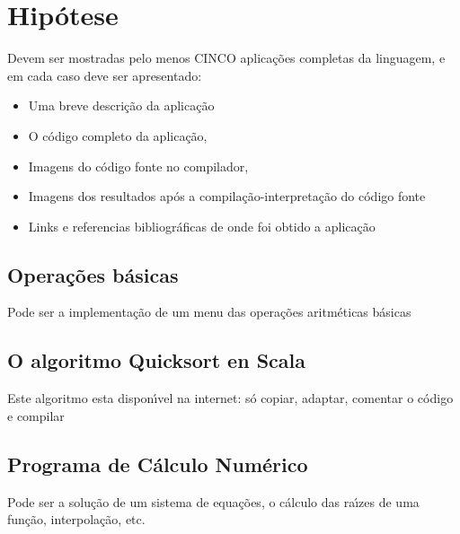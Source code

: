 


\chapter{Hipótese}

Devem ser mostradas pelo menos CINCO aplica\c{c}\~{o}es completas da linguagem, e em cada caso deve ser apresentado:
\begin{itemize}
  \item Uma breve descri\c{c}\~{a}o da aplica\c{c}\~{a}o
  \item O c\'{o}digo completo da aplica\c{c}\~{a}o,
  \item Imagens do c\'{o}digo fonte no compilador,
  \item Imagens dos resultados ap\'{o}s a compila\c{c}\~{a}o-interpreta\c{c}\~{a}o do c\'{o}digo fonte
  \item Links e referencias bibliogr\'{a}ficas de onde foi obtido a aplica\c{c}\~{a}o
\end{itemize}



    \section{Opera\c{c}\~{o}es b\'{a}sicas}
    Pode ser a implementa\c{c}\~{a}o de um menu das opera\c{c}\~{o}es aritm\'{e}ticas b\'{a}sicas



    \section{O algoritmo Quicksort en Scala}
    Este algoritmo esta dispon\'{\i}vel na internet: s\'{o} copiar, adaptar, comentar o c\'{o}digo e compilar



    \section{Programa de C\'{a}lculo Num\'{e}rico}
    Pode ser a solu\c{c}\~{a}o de um sistema de equa\c{c}\~{o}es, o c\'{a}lculo das ra\'{\i}zes de uma fun\c{c}\~{a}o,  interpola\c{c}\~{a}o, etc.


